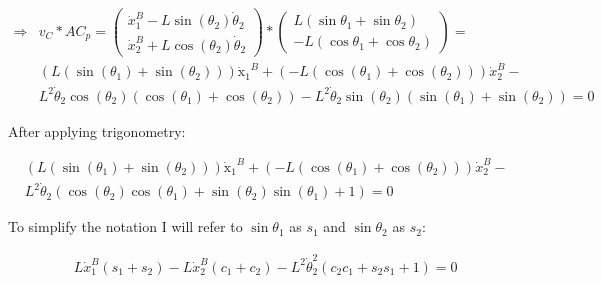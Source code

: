\begin{equation}
    \begin{split}
        \Rightarrow &v_C * AC_p =
        \begin{pmatrix}
            \dot x_1^B - L\sin(\theta_2)\dot\theta_2\\
            \dot x_2^B + L\cos(\theta_2)\dot\theta_2
        \end{pmatrix} * \begin{pmatrix}
            L\left(\sin\theta_1+\sin\theta_2\right)\\
            -L\left(\cos\theta_1+\cos\theta_2\right)
        \end{pmatrix} = \\
        &\left(L\left(\sin\left(\theta _1\right)+\sin\left(\theta _2\right)\right)\right)\mathrm{\dot x_1}^B+\left(-L\left(\cos\left(\theta _1\right)+\cos\left(\theta _2\right)\right)\right)\dot x_2^B-\\
        &L^2\dot\theta_2\cos\left(\theta _2\right)\left(\cos\left(\theta _1\right)+\cos\left(\theta _2\right)\right)-L^2\dot\theta_2\sin\left(\theta _2\right)\left(\sin\left(\theta _1\right)+\sin\left(\theta _2\right)\right) = 0
    \end{split}
\end{equation} 

After applying trigonometry:

\begin{equation}
    \begin{split}           
        &\left(L\left(\sin\left(\theta _1\right)+\sin\left(\theta _2\right)\right)\right)\mathrm{\dot x_1}^B+\left(-L\left(\cos\left(\theta _1\right)+\cos\left(\theta _2\right)\right)\right)\dot x_2^B-\\
        &L^2\dot\theta_2\left(\cos\left(\theta _2\right)\cos\left(\theta _1\right)+\sin\left(\theta _2\right)\sin\left(\theta _1\right)+1\right) = 0
    \end{split}
\end{equation}

To simplify the notation I will refer to $\sin \theta_1$ as $s_1$ and $\sin \theta_2$ as $s_2$:

\begin{equation}
    \begin{split}           
        &L\dot x_1^B\left(s_1+s_2\right)-L\dot x_2^B\left(c_1+c_2\right)-
        L^2\dot\theta_2^2\left(c_2c_1+s_2s_1 + 1\right) = 0
    \end{split}
\end{equation}

